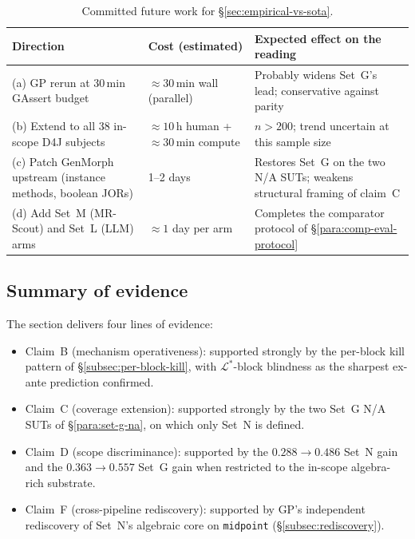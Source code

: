 \begin{table}[h]
\centering
\caption{Committed future work for \S\ref{sec:empirical-vs-sota}.}
\label{tab:future-work}
\small
\begin{tabular}{lll}
\toprule
Direction & Cost (estimated) & Expected effect on the reading \\
\midrule
(a) GP rerun at 30\,min GAssert budget                       & $\approx 30$\,min wall (parallel) & Probably widens Set~G's lead; conservative against parity \\
(b) Extend to all 38 in-scope D4J subjects                    & $\approx 10$\,h human + $\approx 30$\,min compute & $n > 200$; trend uncertain at this sample size \\
(c) Patch GenMorph upstream (instance methods, boolean JORs)  & 1--2 days                         & Restores Set~G on the two N/A SUTs; weakens structural framing of claim~C \\
(d) Add Set~M (MR-Scout) and Set~L (LLM) arms                  & $\approx 1$ day per arm           & Completes the comparator protocol of \S\ref{para:comp-eval-protocol} \\
\bottomrule
\end{tabular}
\end{table}

\subsection{Summary of evidence}
\label{subsec:empirical-summary}

The section delivers four lines of evidence:

\begin{itemize}[nosep,leftmargin=*]
  \item Claim~B (mechanism operativeness): supported strongly by the
        per-block kill pattern of \S\ref{subsec:per-block-kill},
        with $\mathcal{L}^{*}$-block blindness as the sharpest
        ex-ante prediction confirmed.
  \item Claim~C (coverage extension): supported strongly by the two
        Set~G N/A SUTs of \S\ref{para:set-g-na}, on which only
        Set~N is defined.
  \item Claim~D (scope discriminance): supported by the
        $0.288 \rightarrow 0.486$ Set~N gain and the
        $0.363 \rightarrow 0.557$ Set~G gain when restricted to the
        in-scope algebra-rich substrate.
  \item Claim~F (cross-pipeline rediscovery): supported by GP's
        independent rediscovery of Set~N's algebraic core on
        \texttt{midpoint} (\S\ref{subsec:rediscovery}).
\end{itemize}

